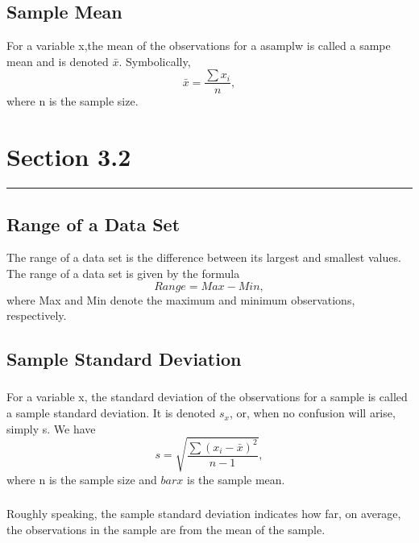 \documentclass[12pt]{article}
\begin{document}
        \subsection*{Sample Mean}
                For a variable x,the mean of the observations for a asamplw is called a
                sampe mean and is denoted \(\bar{x}\). Symbolically,
                \begin{equation}
                    \bar{x} = \frac{\sum{x_i}}{n},
                \end{equation}
                where n is the sample size.
    \section*{Section 3.2}
    \noindent\rule{\textwidth}{0.4pt}
        \subsection*{Range of a Data Set}
            The range of a data set is the difference between its largest and smallest values.
            The range of a data set is given by the formula
            \begin{equation}
                Range = Max - Min,
            \end{equation}
            where Max and Min denote the maximum and minimum observations, respectively.
        \subsection*{Sample Standard Deviation}
            \subsubsection*{}
                For a variable x, the standard deviation of the observations for a sample is called
                a sample standard deviation. It is denoted \(s_x\), or, when no confusion will arise, simply s.
                We have
                \begin{equation}
                    s = \sqrt{\frac{\sum{(x_i-\bar{x})^2}}{n-1}},                
                \end{equation}
                where n is the sample size and \(bar{x}\) is the sample mean.
            \subsubsection*{}
                Roughly speaking, the sample standard deviation indicates how far, on average, the observations
                in the sample are from the mean of the sample.
\end{document}
